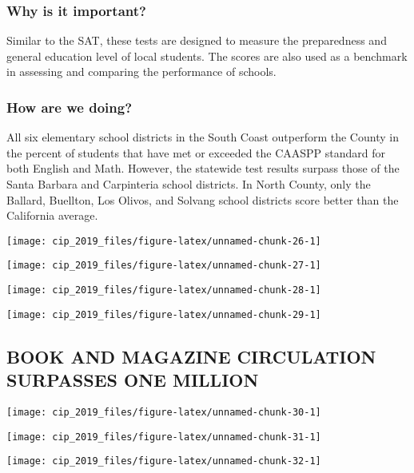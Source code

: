 \documentclass[]{book}
\theoremstyle{definition}
\theoremstyle{definition}
\theoremstyle{definition}
\theoremstyle{remark}
\begin{document}
\subsubsection*{Why is it important?}\label{why-is-it-important-14}

Similar to the SAT, these tests are designed to measure the preparedness
and general education level of local students. The scores are also used
as a benchmark in assessing and comparing the performance of schools.

\subsubsection*{How are we doing?}\label{how-are-we-doing-18}

All six elementary school districts in the South Coast outperform the
County in the percent of students that have met or exceeded the CAASPP
standard for both English and Math. However, the statewide test results
surpass those of the Santa Barbara and Carpinteria school districts. In
North County, only the Ballard, Buellton, Los Olivos, and Solvang school
districts score better than the California average.

\texttt{[image: cip\_2019\_files/figure-latex/unnamed-chunk-26-1]}

\texttt{[image: cip\_2019\_files/figure-latex/unnamed-chunk-27-1]}

\texttt{[image: cip\_2019\_files/figure-latex/unnamed-chunk-28-1]}

\texttt{[image: cip\_2019\_files/figure-latex/unnamed-chunk-29-1]}

\subsection*{BOOK AND MAGAZINE CIRCULATION SURPASSES ONE
MILLION}\label{book-and-magazine-circulation-surpasses-one-million}

\texttt{[image: cip\_2019\_files/figure-latex/unnamed-chunk-30-1]}

\texttt{[image: cip\_2019\_files/figure-latex/unnamed-chunk-31-1]}

\texttt{[image: cip\_2019\_files/figure-latex/unnamed-chunk-32-1]}
\end{document}
